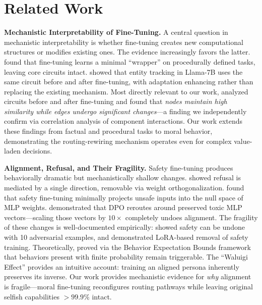 \documentclass[11pt, letterpaper]{article}
\begin{document}
\section{Related Work}

\textbf{Mechanistic Interpretability of Fine-Tuning.}
A central question in mechanistic interpretability is whether fine-tuning creates new computational structures or modifies existing ones. The evidence increasingly favors the latter. \citet{jain2023mechanistically} found that fine-tuning learns a minimal ``wrapper'' on procedurally defined tasks, leaving core circuits intact. \citet{prakash2024finetuning} showed that entity tracking in Llama-7B uses the same circuit before and after fine-tuning, with adaptation enhancing rather than replacing the existing mechanism. Most directly relevant to our work, \citet{chen2025circuit} analyzed circuits before and after fine-tuning and found that \textit{nodes maintain high similarity while edges undergo significant changes}---a finding we independently confirm via correlation analysis of component interactions. Our work extends these findings from factual and procedural tasks to moral behavior, demonstrating the routing-rewiring mechanism operates even for complex value-laden decisions.

\textbf{Alignment, Refusal, and Their Fragility.}
Safety fine-tuning produces behaviorally dramatic but mechanistically shallow changes. \citet{arditi2024refusal} showed refusal is mediated by a single direction, removable via weight orthogonalization. \citet{jain2024safety} found that safety fine-tuning minimally projects unsafe inputs into the null space of MLP weights. \citet{lee2024mechanistic} demonstrated that DPO reroutes around preserved toxic MLP vectors---scaling those vectors by $10\times$ completely undoes alignment. The fragility of these changes is well-documented empirically: \citet{qi2023finetuning} showed safety can be undone with 10 adversarial examples, and \citet{lermen2023lora} demonstrated LoRA-based removal of safety training. Theoretically, \citet{wolf2024fundamental} proved via the Behavior Expectation Bounds framework that behaviors present with finite probability remain triggerable. The ``Waluigi Effect'' \citep{nardo2023waluigi} provides an intuitive account: training an aligned persona inherently preserves its inverse. Our work provides mechanistic evidence for \textit{why} alignment is fragile---moral fine-tuning reconfigures routing pathways while leaving original selfish capabilities $>99.9\%$ intact.
\end{document}
